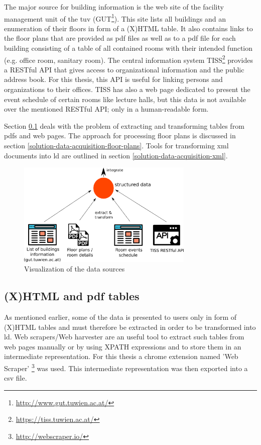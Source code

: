 \documentclass[draft,final]{vutinfth} %
\begin{document}
The major source for building information is the web site of the facility management unit of the \gls{tuv} (GUT\footnote{\url{http://www.gut.tuwien.ac.at/}}). This site lists all buildings and an enumeration of their floors in form of a (X)HTML table. It also contains links to the floor plans that are provided as \gls{pdf} files as well as to a \gls{pdf} file for each building consisting of a table of all contained rooms with their intended function (e.g. office room, sanitary room). The central information system TISS\footnote{\url{https://tiss.tuwien.ac.at/}} provides a RESTful API that gives access to organizational information and the public address book. For this thesis, this API is useful for linking persons and organizations to their offices. TISS has also a web page dedicated to present the event schedule of certain rooms like lecture halls, but this data is not available over the mentioned RESTful API; only in a human-readable form.

Section \ref{solution-data-acquisition-tables} deals with the problem of extracting and transforming tables from \gls{pdf}s and web pages. The approach for processing floor plans is discussed in section \ref{solution-data-acquisition-floor-plans}. Tools for transforming \gls{xml} documents into \gls{ld} are outlined in section \ref{solution-data-acquisition-xml}.

\begin{figure}[h]
    \centering
    \includegraphics[width=0.75\textwidth]{graphics/dataAcquisitionSources.png}
    \caption{Visualization of the data sources}
    \label{fig:solution-data-acquisition:sources}
\end{figure}

\subsection{(X)HTML and \gls{pdf} tables}
\label{solution-data-acquisition-tables}
As mentioned earlier, some of the data is presented to users only in form of (X)HTML tables and must therefore be extracted in order to be transformed into \gls{ld}. Web scrapers/Web harvester are an useful tool to extract such tables from web pages manually or by using XPATH expressions and to store them in an intermediate representation. For this thesis a chrome extension named 'Web Scraper' \footnote{\url{http://webscraper.io/}} was used. This intermediate representation was then exported into a \gls{csv} file. 
\end{document}
